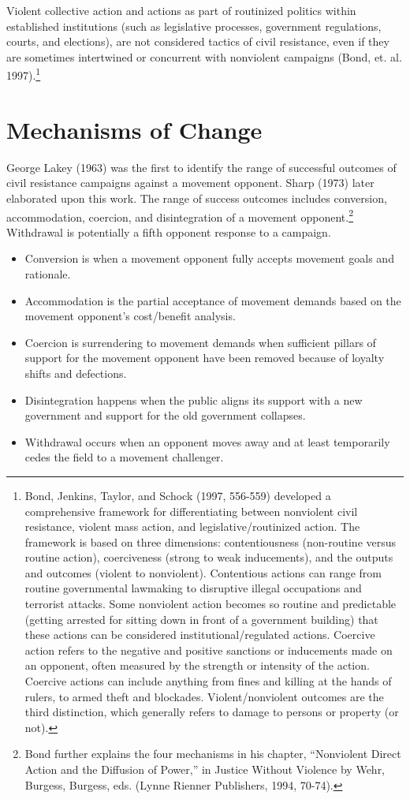 \documentclass[twoside,a4paper,12pt,fleqn,openany]{extbook}
\begin{document}
Violent collective action and actions as part of routinized politics within established institutions (such as legislative processes, government regulations, courts, and elections), are not considered tactics of civil resistance, even if they are sometimes intertwined or concurrent with nonviolent campaigns (Bond, et. al. 1997).\footnote{Bond, Jenkins, Taylor, and Schock (1997, 556-559) developed a comprehensive framework for differentiating between nonviolent civil resistance, violent mass action, and legislative/routinized action. The framework is based on three dimensions: contentiousness (non-routine versus routine action), coerciveness (strong to weak inducements), and the outputs and outcomes (violent to nonviolent). Contentious actions can range from routine governmental lawmaking to disruptive illegal occupations and terrorist attacks. Some nonviolent action becomes so routine and predictable (getting arrested for sitting down in front of a government building) that these actions can be considered institutional/regulated actions. Coercive action refers to the negative and positive sanctions or inducements made on an opponent, often measured by the strength or intensity of the action. Coercive actions can include anything from fines and killing at the hands of rulers, to armed theft and blockades. Violent/nonviolent outcomes are the third distinction, which generally refers to damage to persons or property (or not).}

\section*{Mechanisms of Change}

George Lakey (1963) was the first to identify the range of successful outcomes of civil resistance campaigns against a movement opponent. Sharp (1973) later elaborated upon this work. The range of success outcomes includes conversion, accommodation, coercion, and disintegration of a movement opponent.\footnote{Bond further explains the four mechanisms in his chapter, “Nonviolent Direct Action and the Diffusion of Power,” in Justice Without Violence by Wehr, Burgess, Burgess, eds. (Lynne Rienner Publishers, 1994, 70-74).} Withdrawal is potentially a fifth opponent response to a campaign.

\begin{itemize}
\item Conversion is when a movement opponent fully accepts movement goals and rationale.
\item Accommodation is the partial acceptance of movement demands based on the movement opponent’s cost/benefit analysis.
\item Coercion is surrendering to movement demands when sufficient pillars of support for the movement opponent have been removed because of loyalty shifts and defections.
\item Disintegration happens when the public aligns its support with a new government and support for the old government collapses.
\item Withdrawal occurs when an opponent moves away and at least temporarily cedes the field to a movement challenger.
\end{itemize}
\end{document}
